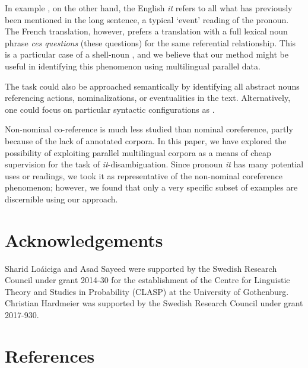 \documentclass[10pt, a4paper]{article}
\begin{document}
In example \label{ex:shellnoun}, on the other hand, the English \textit{it} 
refers to all what has previously been mentioned in the long sentence, a typical 
`event' reading of the pronoun. The French translation, however, prefers a 
translation with a full lexical noun phrase \textit{ces questions} (these 
questions) for the same referential 
relationship. This is a particular case of a shell-noun 
\cite{kolhatkar-etal-2013-interpreting}, and we believe that our method might be useful in identifying this phenomenon using multilingual parallel data. 

The task could also be approached semantically by identifying all abstract
nouns referencing actions, nominalizations, or eventualities in the text. Alternatively, one could focus on particular syntactic configurations as
.

Non-nominal co-reference is much less studied than nominal coreference, partly
because of the lack of annotated corpora. In this paper, we have explored the
possibility of exploiting parallel multilingual corpora as a means of cheap
supervision for the task of \textit{it}-disambiguation. Since pronoun \textit{it} has many
potential uses or readings, we took it as representative of the non-nominal
coreference phenomenon; however, we found that only a very specific subset of examples are discernible using our approach. 

%
%
%
\section{Acknowledgements}
Sharid Lo\'{a}iciga and Asad Sayeed were supported by the Swedish Research
Council under grant 2014-30 for the establishment of the
Centre for Linguistic Theory and Studies in Probability (CLASP) at
the University of Gothenburg.
Christian Hardmeier was supported by the Swedish Research Council under grant 2017-930.

%
%
\section{References}

 


\end{document}
